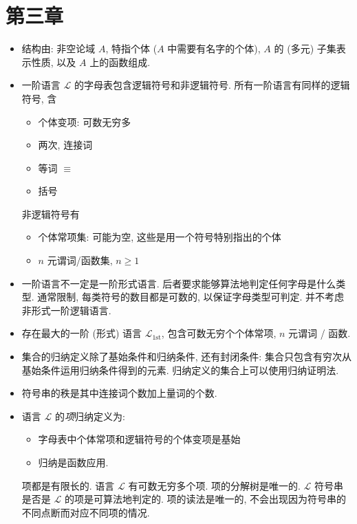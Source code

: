\documentclass[a4paper]{article}
\begin{document}
\section{第三章}
\begin{itemize}
\item 结构由: 非空论域 $A$, 特指个体 ($A$ 中需要有名字的个体), $A$ 的 (多元) 子集表示性质, 以及 $A$ 上的函数组成.

\item 一阶语言 $\mathcal{L}$ 的字母表包含逻辑符号和非逻辑符号.
    所有一阶语言有同样的逻辑符号, 含 \begin{itemize}
        \item 个体变项: 可数无穷多
        \item 两次, 连接词
        \item 等词 $\equiv$
        \item 括号
    \end{itemize}
    非逻辑符号有 \begin{itemize}
        \item 个体常项集: 可能为空, 这些是用一个符号特别指出的个体
        \item $n$ 元谓词/函数集, $n \ge 1$
    \end{itemize}

\item 一阶语言不一定是一阶形式语言. 后者要求能够算法地判定任何字母是什么类型.
    通常限制, 每类符号的数目都是可数的, 以保证字母类型可判定.
    并不考虑非形式一阶逻辑语言.

\item 存在最大的一阶 (形式) 语言 $\mathcal{L}_{\text{1st}}$, 包含可数无穷个个体常项, $n$ 元谓词 / 函数.

\item 集合的归纳定义除了基始条件和归纳条件, 还有封闭条件:
    集合只包含有穷次从基始条件运用归纳条件得到的元素.
        归纳定义的集合上可以使用归纳证明法.

\item 符号串的秩是其中连接词个数加上量词的个数.

\item 语言 $\mathcal{L}$ 的\emph{项}归纳定义为: \begin{itemize}
    \item 字母表中个体常项和逻辑符号的个体变项是基始
    \item 归纳是函数应用.
    \end{itemize}
    项都是有限长的. 语言 $\mathcal{L}$ 有可数无穷多个项. 项的分解树是唯一的.
    $\mathcal{L}$ 符号串是否是 $\mathcal{L}$ 的项是可算法地判定的.
    项的读法是唯一的, 不会出现因为符号串的不同点断而对应不同项的情况.


\end{itemize}
\end{document}

